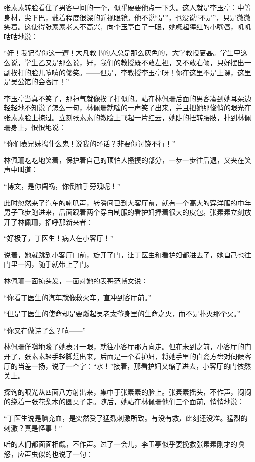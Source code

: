 \par 张素素转脸看住了男客中间的一个，似乎硬要他点一下头。这人就是李玉亭：中等身材，尖下巴，戴着程度很深的近视眼镜。他不说“是”，也没说“不是”，只是微微笑着。这使得张素素老大不高兴，向李玉亭白了一眼，她噘起猩红的小嘴唇，叽叽咕咕地说：
\par “好！我记得你这一遭！大凡教书的人总是那么灰色的，大学教授更甚。学生甲这么说，学生乙又是那么说，好，我们的教授既不敢左袒，又不敢右倾，只好摆出一副挨打的脸儿嘻嘻的傻笑。——但是，李教授李玉亭呀！你在这里不是上课，这里是吴公馆的会客厅！”
\par 李玉亭当真不笑了，那神气就像挨了打似的。站在林佩珊后面的男客凑到她耳朵边轻轻地不知说了怎么一句，林佩珊就嗤的一声笑了出来，并且把她那俊俏的眼光在张素素脸上掠过。立刻张素素的嫩脸上飞起一片红云，她陡的扭转腰肢，扑到林佩珊身上，恨恨地说：
\par “你们表兄妹捣什么鬼！说我的坏话？非要你讨饶不行！”
\par 林佩珊吃吃地笑着，保护着自己的顶怕人搔摸的部分，一步一步往后退，又夹在笑声中叫道：
\par “博文，是你闯祸，你倒袖手旁观呢！”
\par 此时忽然来了汽车的喇叭声，转瞬间已到大客厅前，就有一个高大的穿洋服的中年男子飞步跑进来，后面跟着两个穿白制服的看护妇捧着很大的皮包。张素素立刻放开了林佩珊，招呼那新来者：
\par “好极了，丁医生！病人在小客厅！”
\par 说着，她就跳到小客厅门前，旋开了门，让丁医生和看护妇都进去了，她自己也往门里一闪，随手就带上了门。
\par 林佩珊一面掠头发，一面对她的表哥范博文说：
\par “你看丁医生的汽车就像救火车，直冲到客厅前。”
\par “但是丁医生的使命却是要燃起吴老太爷身里的生命之火，而不是扑灭那个火。”
\par “你又在做诗了么？嘻——”
\par 林佩珊佯嗔地睃了她表哥一眼，就往小客厅那方向走。但在未到之前，小客厅的门开了，张素素轻手轻脚踅出来，后面是一个看护妇，将她手里的白瓷方盘对伺候客厅的当差一扬，说了一个字：“水！”接着，那看护妇又缩了进去，小客厅的门依然关上。
\par 探询的眼光从四面八方射出来，集中于张素素的脸上。张素素摇头，不作声，闷闷的绕着一张花梨木的圆桌子走。随后，她站在林佩珊他们三个面前，悄悄地说：
\par “丁医生说是脑充血，是突然受了猛烈刺激所致。有没有救，此刻还没准。猛烈的刺激？真是怪事！”
\par 听的人们都面面相觑，不作声。过了一会儿，李玉亭似乎要挽救张素素刚才的嗔怒，应声虫似的也说了一句：
